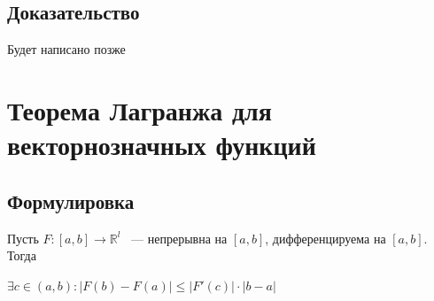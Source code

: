 \documentclass{article}
\begin{document}
        \subsection{Доказательство}
        
            Будет написано позже
            
    \newpage
    
    \section{Теорема Лагранжа для векторнозначных функций}
    
        \subsection{Формулировка}
        
            Пусть $F: [a, b] \rightarrow \mathbb{R}^l$ ~--- непрерывна на $[a, b]$, дифференцируема на $[a, b]$. Тогда
            
            $\exists c \in (a, b) : \left| F(b) - F(a) \right| \leq \left| F'(c) \right| \cdot |b - a|$
            
\end{document}
